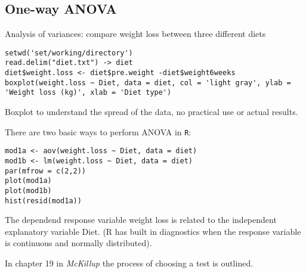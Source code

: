 \documentclass{article}
\theoremstyle{definition}
\begin{document}
\subsection{One-way ANOVA}
Analysis of variances: compare weight loss between three different diets
\begin{lstlisting}
setwd('set/working/directory')
read.delim("diet.txt") -> diet
diet$weight.loss <- diet$pre.weight -diet$weight6weeks
boxplot(weight.loss ~ Diet, data = diet, col = 'light gray', ylab = 'Weight loss (kg)', xlab = 'Diet type')
\end{lstlisting}
Boxplot to understand the spread of the data, no practical use or actual results.\par 
There are two basic ways to perform ANOVA in \texttt{R}:
\begin{lstlisting}
mod1a <- aov(weight.loss ~ Diet, data = diet)
mod1b <- lm(weight.loss ~ Diet, data = diet)
par(mfrow = c(2,2))
plot(mod1a)
plot(mod1b)
hist(resid(mod1a))
\end{lstlisting}
The dependend response variable weight loss is related to the independent explanatory variable Diet. (R has built in diagnostics when the response variable is continuous and normally distributed). 

In chapter 19 in \textit{McKillup} the process of choosing a test is outlined. 
\end{document}
